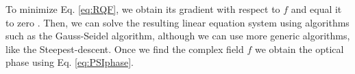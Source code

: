To minimize Eq. \eqref{eq:RQF}, we obtain its gradient with respect to $f$ and
equal it to zero \cite{RQF,AQF,AQF_mult}. Then, we can solve the resulting linear equation system using
algorithms such as the Gauss-Seidel algorithm, although we can use more generic 
algorithms, like the Steepest-descent. Once we find the complex field $f$ we 
obtain the optical phase using Eq. \eqref{eq:PSIphase}.
